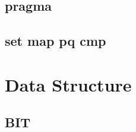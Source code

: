 \documentclass[a4paper,10pt,twocolumn,oneside,x11names]{article}
\begin{document}
\subsection{pragma}


\subsection{set map pq cmp}


%

%

\section{Data Structure}

\subsection{BIT}


% 

% 

%
\end{document}

